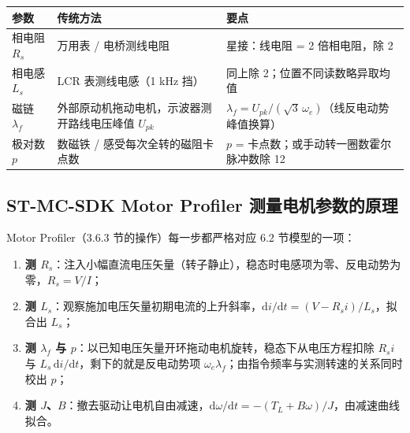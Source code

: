 \documentclass[
  UTF8,
  scheme=plain,
  fontsize=10pt,
  openany
]{ctexbook}
\begin{document}
{\def\LTcaptype{none} %
\begin{longtable}[]{@{}
  >{\raggedright\arraybackslash}p{}
  >{\raggedright\arraybackslash}p{}
  >{\raggedright\arraybackslash}p{}@{}}
\toprule\noalign{}
\begin{minipage}[b]{\linewidth}\raggedright
参数
\end{minipage} & \begin{minipage}[b]{\linewidth}\raggedright
传统方法
\end{minipage} & \begin{minipage}[b]{\linewidth}\raggedright
要点
\end{minipage} \\
\midrule\noalign{}
\endhead
\bottomrule\noalign{}
\endlastfoot
相电阻 \(R_s\) & 万用表 / 电桥测线电阻 & 星接：线电阻 = 2 倍相电阻，除
2 \\
相电感 \(L_s\) & LCR 表测线电感（1 kHz 挡） & 同上除
2；位置不同读数略异取均值 \\
磁链 \(\lambda_f\) & 外部原动机拖动电机，示波器测开路线电压峰值
\(U_{pk}\) &
\(\lambda_f = U_{pk} / (\sqrt{3} \, \omega_e)\)（线反电动势峰值换算） \\
极对数 \(p\) & 数磁铁 / 感受每次全转的磁阻卡点数 & \(p\) =
卡点数；或手动转一圈数霍尔脉冲数除 12 \\
\end{longtable}
}

\subsection{ST-MC-SDK Motor Profiler
测量电机参数的原理}\label{st-mc-sdk-motor-profiler-ux6d4bux91cfux7535ux673aux53c2ux6570ux7684ux539fux7406}

Motor Profiler（3.6.3 节的操作）每一步都严格对应 6.2 节模型的一项：

\begin{enumerate}
\def\labelenumi{\arabic{enumi}.}
\tightlist
\item
  \textbf{测
  \(R_s\)}：注入小幅直流电压矢量（转子静止），稳态时电感项为零、反电动势为零，\(R_s = V / I\)；
\item
  \textbf{测
  \(L_s\)}：观察施加电压矢量初期电流的上升斜率，\(\mathrm{d}i/\mathrm{d}t = (V - R_s i)/L_s\)，拟合出
  \(L_s\)；
\item
  \textbf{测 \(\lambda_f\) 与
  \(p\)}：以已知电压矢量开环拖动电机旋转，稳态下从电压方程扣除 \(R_s i\)
  与 \(L_s\,\mathrm{d}i/\mathrm{d}t\)，剩下的就是反电动势项
  \(\omega_e \lambda_f\)；由指令频率与实测转速的关系同时校出 \(p\)；
\item
  \textbf{测
  \(J\)、\(B\)}：撤去驱动让电机自由减速，\(\mathrm{d}\omega/\mathrm{d}t = -(T_L + B\omega)/J\)，由减速曲线拟合。
\end{enumerate}
\end{document}

